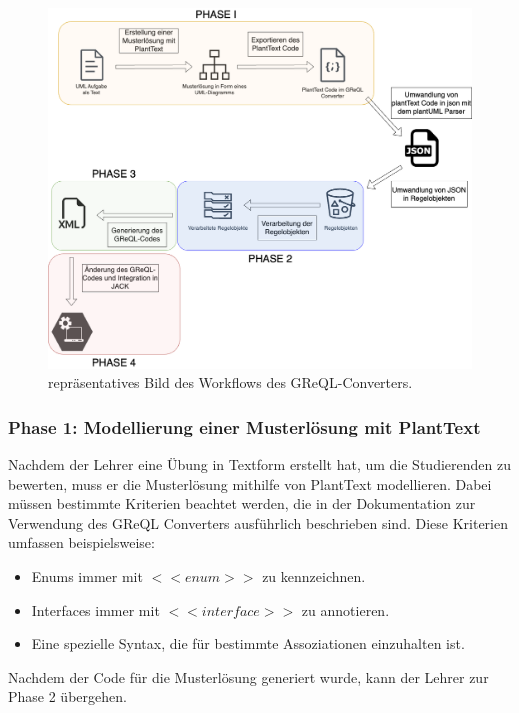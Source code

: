 \begin{figure}
    \centering
    \includegraphics[width=15cm]{images/workflow}
    \caption{repräsentatives Bild des Workflows des GReQL-Converters.}
    \label{fig:workflow}
\end{figure}

\subsubsection{Phase 1: Modellierung einer Musterlösung mit PlantText}

Nachdem der Lehrer eine Übung in Textform erstellt hat, um die Studierenden zu bewerten, muss er die Musterlösung
mithilfe von PlantText modellieren. Dabei müssen bestimmte Kriterien beachtet werden, die in der Dokumentation zur 
Verwendung des GReQL Converters ausführlich beschrieben sind. Diese Kriterien umfassen beispielsweise:

\begin{itemize}
    \item Enums immer mit $<<enum>>$ zu kennzeichnen.
    \item Interfaces immer mit $<<interface>>$ zu annotieren.
    \item Eine spezielle Syntax, die für bestimmte Assoziationen einzuhalten ist.
\end{itemize}

Nachdem der Code für die Musterlösung generiert wurde, kann der Lehrer zur Phase 2 übergehen.


